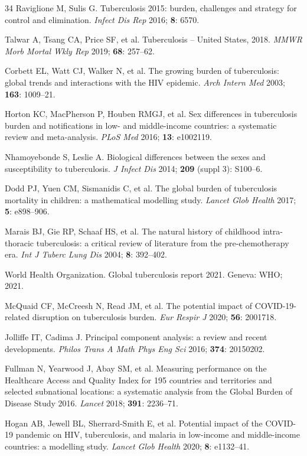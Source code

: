 \documentclass[12pt]{article}
\begin{document}
\begin{thebibliography}{34}
Raviglione M, Sulis G. Tuberculosis 2015: burden, challenges and strategy for control and elimination. \textit{Infect Dis Rep} 2016; \textbf{8}: 6570.

Talwar A, Tsang CA, Price SF, et al. Tuberculosis -- United States, 2018. \textit{MMWR Morb Mortal Wkly Rep} 2019; \textbf{68}: 257--62.

Corbett EL, Watt CJ, Walker N, et al. The growing burden of tuberculosis: global trends and interactions with the HIV epidemic. \textit{Arch Intern Med} 2003; \textbf{163}: 1009--21.

Horton KC, MacPherson P, Houben RMGJ, et al. Sex differences in tuberculosis burden and notifications in low- and middle-income countries: a systematic review and meta-analysis. \textit{PLoS Med} 2016; \textbf{13}: e1002119.

Nhamoyebonde S, Leslie A. Biological differences between the sexes and susceptibility to tuberculosis. \textit{J Infect Dis} 2014; \textbf{209} (suppl 3): S100--6.

Dodd PJ, Yuen CM, Sismanidis C, et al. The global burden of tuberculosis mortality in children: a mathematical modelling study. \textit{Lancet Glob Health} 2017; \textbf{5}: e898--906.

Marais BJ, Gie RP, Schaaf HS, et al. The natural history of childhood intra-thoracic tuberculosis: a critical review of literature from the pre-chemotherapy era. \textit{Int J Tuberc Lung Dis} 2004; \textbf{8}: 392--402.

World Health Organization. Global tuberculosis report 2021. Geneva: WHO; 2021.

McQuaid CF, McCreesh N, Read JM, et al. The potential impact of COVID-19-related disruption on tuberculosis burden. \textit{Eur Respir J} 2020; \textbf{56}: 2001718.

Jolliffe IT, Cadima J. Principal component analysis: a review and recent developments. \textit{Philos Trans A Math Phys Eng Sci} 2016; \textbf{374}: 20150202.

Fullman N, Yearwood J, Abay SM, et al. Measuring performance on the Healthcare Access and Quality Index for 195 countries and territories and selected subnational locations: a systematic analysis from the Global Burden of Disease Study 2016. \textit{Lancet} 2018; \textbf{391}: 2236--71.

Hogan AB, Jewell BL, Sherrard-Smith E, et al. Potential impact of the COVID-19 pandemic on HIV, tuberculosis, and malaria in low-income and middle-income countries: a modelling study. \textit{Lancet Glob Health} 2020; \textbf{8}: e1132--41.


\end{thebibliography}
\end{document}

